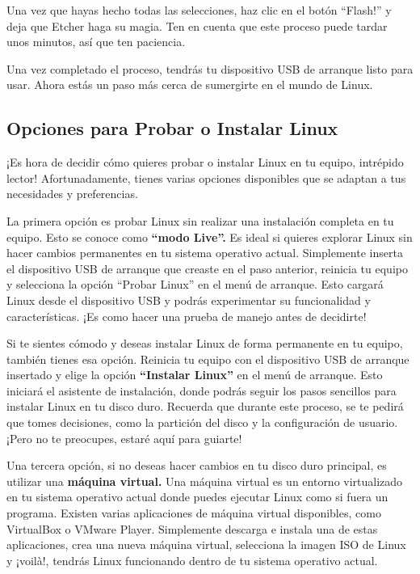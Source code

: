 \documentclass[
  jou,
  floatsintext,
  longtable,
  a4paper,
  nolmodern,
  notxfonts,
  notimes,
  colorlinks=true,linkcolor=blue,citecolor=blue,urlcolor=blue]{apa7}
\begin{document}
Una vez que hayas hecho todas las selecciones, haz clic en el botón
``Flash!'' y deja que Etcher haga su magia. Ten en cuenta que este
proceso puede tardar unos minutos, así que ten paciencia.

Una vez completado el proceso, tendrás tu dispositivo USB de arranque
listo para usar. Ahora estás un paso más cerca de sumergirte en el mundo
de Linux.

\subsection{Opciones para Probar o Instalar
Linux}\label{opciones-para-probar-o-instalar-linux}

¡Es hora de decidir cómo quieres probar o instalar Linux en tu equipo,
intrépido lector! Afortunadamente, tienes varias opciones disponibles
que se adaptan a tus necesidades y preferencias.

La primera opción es probar Linux sin realizar una instalación completa
en tu equipo. Esto se conoce como \textbf{``modo Live''.} Es ideal si
quieres explorar Linux sin hacer cambios permanentes en tu sistema
operativo actual. Simplemente inserta el dispositivo USB de arranque que
creaste en el paso anterior, reinicia tu equipo y selecciona la opción
``Probar Linux'' en el menú de arranque. Esto cargará Linux desde el
dispositivo USB y podrás experimentar su funcionalidad y
características. ¡Es como hacer una prueba de manejo antes de decidirte!

Si te sientes cómodo y deseas instalar Linux de forma permanente en tu
equipo, también tienes esa opción. Reinicia tu equipo con el dispositivo
USB de arranque insertado y elige la opción \textbf{``Instalar Linux''}
en el menú de arranque. Esto iniciará el asistente de instalación, donde
podrás seguir los pasos sencillos para instalar Linux en tu disco duro.
Recuerda que durante este proceso, se te pedirá que tomes decisiones,
como la partición del disco y la configuración de usuario. ¡Pero no te
preocupes, estaré aquí para guiarte!

Una tercera opción, si no deseas hacer cambios en tu disco duro
principal, es utilizar una \textbf{máquina virtual.} Una máquina virtual
es un entorno virtualizado en tu sistema operativo actual donde puedes
ejecutar Linux como si fuera un programa. Existen varias aplicaciones de
máquina virtual disponibles, como VirtualBox o VMware Player.
Simplemente descarga e instala una de estas aplicaciones, crea una nueva
máquina virtual, selecciona la imagen ISO de Linux y ¡voilà!, tendrás
Linux funcionando dentro de tu sistema operativo actual.
\end{document}
